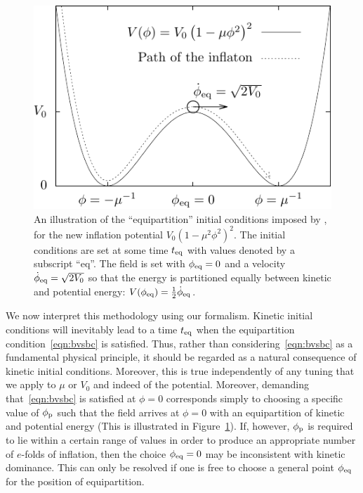 %
\begin{figure}[ht]
  \includegraphics[width=\textwidth]{chapter_kinetic_dominance/figures/newpot}
  \caption{An illustration of the ``equipartition'' initial conditions imposed by \protect\citet{boyanovsky_cmb_2006}, for the new inflation potential $V_0{\left(1-\mu^2\phi^2\right)}^2$. The initial conditions are set at some time $t_{\mathrm{eq}}$ with values denoted by a subscript ``eq''. The field is set with $\phi_{\mathrm{eq}}=0$ and a velocity $\dot{\phi}_{\mathrm{eq}}= \sqrt{2V_0}$ so that the energy is partitioned equally between kinetic and potential energy: $V(\phi_{\mathrm{eq}}) = \frac{1}{2}\dot{\phi}_{\mathrm{eq}}$.\label{fig:figure_BVS_initial_conditions}}
\end{figure}
%

We now interpret this methodology using our formalism. Kinetic initial conditions will inevitably lead to a time $t_{\mathrm{eq}}$ when the equipartition condition~\eqref{eqn:bvsbc} is satisfied. Thus, rather than considering~\eqref{eqn:bvsbc} as a fundamental physical principle, it should be regarded as a natural consequence of kinetic initial conditions. Moreover, this is true independently of any tuning that we apply to $\mu$ or $V_0$ and indeed of the potential. Moreover, demanding that~\eqref{eqn:bvsbc} is satisfied at $\phi=0$ corresponds simply to choosing a specific value of $\phi_{\mathrm{p}}$ such that the field arrives at $\phi=0$ with an equipartition of kinetic and potential energy (This is illustrated in Figure~\ref{fig:figure_BVS_initial_conditions}).  If, however, $\phi_{\mathrm{p}}$ is required to lie within a certain range of values in order to produce an appropriate number of $e$-folds of inflation, then the choice $\phi_{\mathrm{eq}}=0$ may be inconsistent with kinetic dominance. This can only be resolved if one is free to choose a general point $\phi_{\mathrm{eq}}$ for the position of equipartition.  

